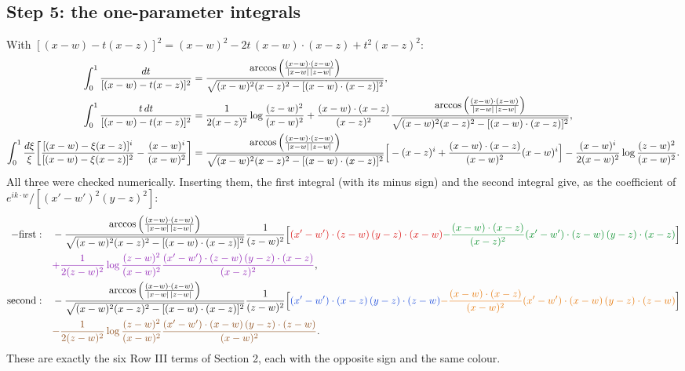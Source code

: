 \documentclass[10pt]{article}
\newcommand{\R}[1]{{\color{cR}#1}}
\newcommand{\B}[1]{{\color{cB}#1}}
\newcommand{\G}[1]{{\color{cG}#1}}
\newcommand{\Or}[1]{{\color{cO}#1}}
\newcommand{\Vi}[1]{{\color{cV}#1}}
\newcommand{\Br}[1]{{\color{cN}#1}}
\begin{document}
\subsection*{Step 5: the one-parameter integrals}
With $[(x-w)-t(x-z)]^{2}=(x-w)^{2}-2t\,(x-w)\cdot(x-z)+t^{2}(x-z)^{2}$:
\begin{align}
\int_{0}^{1}\frac{dt}{[(x-w)-t(x-z)]^{2}}&=\frac{\arccos\Big(\frac{(x-w)\cdot(z-w)}{|x-w|\,|z-w|}\Big)}{\sqrt{(x-w)^{2}(x-z)^{2}-[(x-w)\cdot(x-z)]^{2}}},\notag\\
\int_{0}^{1}\frac{t\,dt}{[(x-w)-t(x-z)]^{2}}&=\frac{1}{2(x-z)^{2}}\log\frac{(z-w)^{2}}{(x-w)^{2}}+\frac{(x-w)\cdot(x-z)}{(x-z)^{2}}\frac{\arccos\Big(\frac{(x-w)\cdot(z-w)}{|x-w|\,|z-w|}\Big)}{\sqrt{(x-w)^{2}(x-z)^{2}-[(x-w)\cdot(x-z)]^{2}}},\notag\\
\int_{0}^{1}\frac{d\xi}{\xi}\bigg[\frac{[(x-w)-\xi(x-z)]^{i}}{[(x-w)-\xi(x-z)]^{2}}-\frac{(x-w)^{i}}{(x-w)^{2}}\bigg]&=\frac{\arccos\Big(\frac{(x-w)\cdot(z-w)}{|x-w|\,|z-w|}\Big)}{\sqrt{(x-w)^{2}(x-z)^{2}-[(x-w)\cdot(x-z)]^{2}}}\Big[-(x-z)^{i}+\frac{(x-w)\cdot(x-z)}{(x-w)^{2}}(x-w)^{i}\Big]-\frac{(x-w)^{i}}{2(x-w)^{2}}\log\frac{(z-w)^{2}}{(x-w)^{2}}.
\end{align}
All three were checked numerically. Inserting them, the first integral (with its minus sign) and the second integral give, as the coefficient of $e^{ik\cdot w}/[(x'-w')^{2}(y-z)^{2}]$:
\begin{align}
-\text{first}:&\quad-\frac{\arccos\Big(\frac{(x-w)\cdot(z-w)}{|x-w|\,|z-w|}\Big)}{\sqrt{(x-w)^{2}(x-z)^{2}-[(x-w)\cdot(x-z)]^{2}}}\frac{1}{(z-w)^{2}}\Big[\R{(x'-w')\cdot(z-w)\,(y-z)\cdot(x-w)}\G{-\frac{(x-w)\cdot(x-z)}{(x-z)^{2}}(x'-w')\cdot(z-w)\,(y-z)\cdot(x-z)}\Big]\notag\\
&\quad\Vi{+\frac{1}{2(z-w)^{2}}\log\frac{(z-w)^{2}}{(x-w)^{2}}\frac{(x'-w')\cdot(z-w)\,(y-z)\cdot(x-z)}{(x-z)^{2}}},\notag\\
\text{second}:&\quad-\frac{\arccos\Big(\frac{(x-w)\cdot(z-w)}{|x-w|\,|z-w|}\Big)}{\sqrt{(x-w)^{2}(x-z)^{2}-[(x-w)\cdot(x-z)]^{2}}}\frac{1}{(z-w)^{2}}\Big[\B{(x'-w')\cdot(x-z)\,(y-z)\cdot(z-w)}\Or{-\frac{(x-w)\cdot(x-z)}{(x-w)^{2}}(x'-w')\cdot(x-w)\,(y-z)\cdot(z-w)}\Big]\notag\\
&\quad\Br{-\frac{1}{2(z-w)^{2}}\log\frac{(z-w)^{2}}{(x-w)^{2}}\frac{(x'-w')\cdot(x-w)\,(y-z)\cdot(z-w)}{(x-w)^{2}}}.
\end{align}
These are exactly the six Row III terms of Section 2, each with the opposite sign and the same colour.
\end{document}

